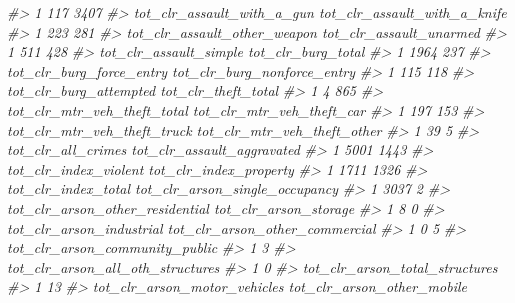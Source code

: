 \documentclass[
]{krantz}
\makeatletter
\newenvironment{Shaded}{\begin{snugshade}}{\end{snugshade}}
\newcommand{\CommentTok}[1]{\textcolor[rgb]{0.37,0.37,0.37}{\textit{#1}}}
\newenvironment{kframe}{%
\medskip{}
\setlength{\fboxsep}{.8em}
 \def\at@end@of@kframe{}%
 \ifinner\ifhmode%
  \def\at@end@of@kframe{\end{minipage}}%
  \begin{minipage}{\columnwidth}%
 \fi\fi%
 \def\FrameCommand##1{\hskip\@totalleftmargin \hskip-\fboxsep
 \colorbox{shadecolor}{##1}\hskip-\fboxsep
     \hskip-\linewidth \hskip-\@totalleftmargin \hskip\columnwidth}%
 \MakeFramed {\advance\hsize-\width
   \@totalleftmargin\z@ \linewidth\hsize
   \@setminipage}}%
 {\par\unskip\endMakeFramed%
 \at@end@of@kframe}
\renewenvironment{Shaded}{\begin{kframe}}{\end{kframe}}
\makeatother
\begin{document}
\begin{Shaded}
\begin{Highlighting}[]
\CommentTok{\#\textgreater{} 1                     117                  3407}
\CommentTok{\#\textgreater{}   tot\_clr\_assault\_with\_a\_gun tot\_clr\_assault\_with\_a\_knife}
\CommentTok{\#\textgreater{} 1                        223                          281}
\CommentTok{\#\textgreater{}   tot\_clr\_assault\_other\_weapon tot\_clr\_assault\_unarmed}
\CommentTok{\#\textgreater{} 1                          511                     428}
\CommentTok{\#\textgreater{}   tot\_clr\_assault\_simple tot\_clr\_burg\_total}
\CommentTok{\#\textgreater{} 1                   1964                237}
\CommentTok{\#\textgreater{}   tot\_clr\_burg\_force\_entry tot\_clr\_burg\_nonforce\_entry}
\CommentTok{\#\textgreater{} 1                      115                         118}
\CommentTok{\#\textgreater{}   tot\_clr\_burg\_attempted tot\_clr\_theft\_total}
\CommentTok{\#\textgreater{} 1                      4                 865}
\CommentTok{\#\textgreater{}   tot\_clr\_mtr\_veh\_theft\_total tot\_clr\_mtr\_veh\_theft\_car}
\CommentTok{\#\textgreater{} 1                         197                       153}
\CommentTok{\#\textgreater{}   tot\_clr\_mtr\_veh\_theft\_truck tot\_clr\_mtr\_veh\_theft\_other}
\CommentTok{\#\textgreater{} 1                          39                           5}
\CommentTok{\#\textgreater{}   tot\_clr\_all\_crimes tot\_clr\_assault\_aggravated}
\CommentTok{\#\textgreater{} 1               5001                       1443}
\CommentTok{\#\textgreater{}   tot\_clr\_index\_violent tot\_clr\_index\_property}
\CommentTok{\#\textgreater{} 1                  1711                   1326}
\CommentTok{\#\textgreater{}   tot\_clr\_index\_total tot\_clr\_arson\_single\_occupancy}
\CommentTok{\#\textgreater{} 1                3037                              2}
\CommentTok{\#\textgreater{}   tot\_clr\_arson\_other\_residential tot\_clr\_arson\_storage}
\CommentTok{\#\textgreater{} 1                               8                     0}
\CommentTok{\#\textgreater{}   tot\_clr\_arson\_industrial tot\_clr\_arson\_other\_commercial}
\CommentTok{\#\textgreater{} 1                        0                              5}
\CommentTok{\#\textgreater{}   tot\_clr\_arson\_community\_public}
\CommentTok{\#\textgreater{} 1                              3}
\CommentTok{\#\textgreater{}   tot\_clr\_arson\_all\_oth\_structures}
\CommentTok{\#\textgreater{} 1                                0}
\CommentTok{\#\textgreater{}   tot\_clr\_arson\_total\_structures}
\CommentTok{\#\textgreater{} 1                             13}
\CommentTok{\#\textgreater{}   tot\_clr\_arson\_motor\_vehicles tot\_clr\_arson\_other\_mobile}

\end{Highlighting}
\end{Shaded}
\end{document}
